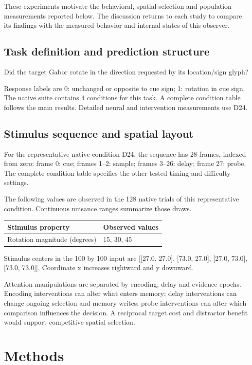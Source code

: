 \documentclass[11pt]{article}
\begin{document}
These experiments motivate the behavioral, spatial-selection and population measurements reported below. The discussion returns to each study to compare its findings with the measured behavior and internal states of this observer.
\subsection{Task definition and prediction structure}
Did the target Gabor rotate in the direction requested by its location/sign glyph?

Response labels are 0: unchanged or opposite to cue sign; 1: rotation in cue sign. The native suite contains 4 conditions for this task. A complete condition table follows the main results. Detailed neural and intervention measurements use D24.

\subsection{Stimulus sequence and spatial layout}
For the representative native condition D24, the sequence has 28 frames, indexed from zero: frame 0: cue; frames 1--2: sample; frames 3--26: delay; frame 27: probe. The complete condition table specifies the other tested timing and difficulty settings.

The following values are observed in the 128 native trials of this representative condition. Continuous nuisance ranges summarize those draws.
\begin{center}\small\begin{tabular}{p{}p{}}\toprule Stimulus property & Observed values\\\midrule
Rotation magnitude (degrees) & 15, 30, 45\\
\bottomrule\end{tabular}\normalsize\end{center}
Stimulus centers in the 100 by 100 input are [[27.0, 27.0], [73.0, 27.0], [27.0, 73.0], [73.0, 73.0]]. Coordinate x increases rightward and y downward.

Attention manipulations are separated by encoding, delay and evidence epochs. Encoding interventions can alter what enters memory; delay interventions can change ongoing selection and memory writes; probe interventions can alter which comparison influences the decision. A reciprocal target cost and distractor benefit would support competitive spatial selection.


\section{Methods}
\end{document}
